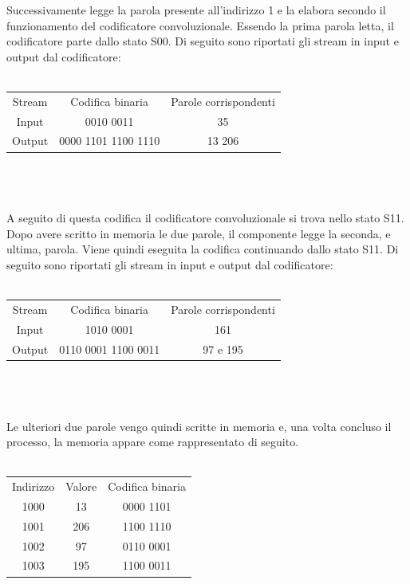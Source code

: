 \documentclass{article}
\begin{document}
Successivamente legge la parola presente all'indirizzo 1 e la elabora secondo il funzionamento del codificatore convoluzionale.  Essendo la prima parola letta, il codificatore parte dallo stato S00. Di seguito sono riportati gli stream in input e output dal codificatore: 
\\
\\
\begin{tabular}{c c c}
	Stream & Codifica binaria & Parole corrispondenti \\
	Input &  0010 0011 & 35 \\
	Output & 0000 1101  1100 1110& 13 206 \\
\end{tabular}
\\
\\
\\
A seguito di questa codifica il codificatore convoluzionale si trova nello stato S11. Dopo avere scritto in memoria le due parole, il componente legge la seconda, e ultima, parola. Viene quindi eseguita la codifica continuando dallo stato S11. Di seguito sono riportati gli stream in input e output dal codificatore: 
\\
\\
\begin{tabular}{c c c}
	Stream & Codifica binaria & Parole corrispondenti \\
	Input & 1010 0001 & 161 \\
	Output & 0110 0001 1100 0011 & 97 e 195 \\
\end{tabular}
\\
\\
\\
Le ulteriori due parole vengo quindi scritte in memoria e, una volta concluso il processo, la memoria appare come rappresentato di seguito.
\\
\\
\begin{tabular}{c c c}
	Indirizzo & Valore & Codifica binaria \\
	1000 & 13 & 0000 1101 \\
	1001 & 206 & 1100 1110 \\
	1002 & 97 & 0110 0001 \\
	1003 & 195 & 1100 0011 \\
\end{tabular}
\\
\\
\end{document}
